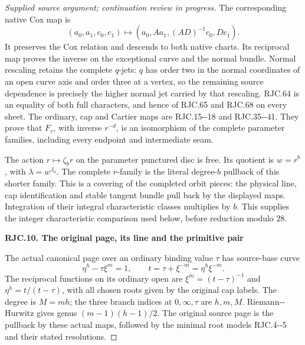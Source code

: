\begin{proof}[Supplied source argument; continuation review in progress]
The corresponding native Cox map is
\[
 (a_0,a_1,c_0,c_1)\longmapsto
 (a_0,Aa_1,(AD)^{-1}c_0,Dc_1).
 \tag{RJC.68}
\]
It preserves the Cox relation and descends to both
native charts. Its reciprocal map proves the
inverse on the exceptional curve and the normal
bundle. Normal rescaling retains the complete
\(q\)-jets: \(q\) has order two in the normal
coordinates of an open curve axis and order three
at a vertex, so the remaining source dependence
is precisely the higher normal jet carried by
that rescaling.
RJC.64 is an equality of both full characters,
and hence of RJC.65 and RJC.68 on every sheet.
The ordinary, cap and Cartier maps are
RJC.15-\/-18 and RJC.35-\/-41.
They prove that \(F_r\), with inverse \(r^{-d}\),
is an isomorphism of the complete parameter
families, including every endpoint and intermediate
seam.

The action \(r\mapsto\zeta_b r\) on the parameter
punctured disc is free. Its quotient is \(w=r^b\),
with \(\lambda=w^{J_0}\).
The complete \(r\)-family is the literal degree-\(b\)
pullback of this shorter family.
This is a covering of the completed orbit pieces:
the physical line, cap identification and stable
tangent bundle pull back by the displayed maps.
Integration of their integral characteristic
classes multiplies by \(b\). This supplies the
integer characteristic comparison used below,
before reduction modulo \(28\).

\par

\medskip\noindent\textbf{RJC.10. The original page, its line and the primitive pair}

\par\nobreak

The actual canonical page over an ordinary binding
value \(\tau\) has source-base curve
\[
 \eta^h-\tau\xi^m=1,\qquad
 t=\tau+\xi^{-m}=\eta^h\xi^{-m}.
 \tag{RJC.69}
\]
The reciprocal functions on its ordinary open are
\(\xi^m=(t-\tau)^{-1}\) and
\(\eta^h=t/(t-\tau)\), with all chosen roots
given by the original cap labels.
The degree is \(M=mh\); the three branch indices
at \(0,\infty,\tau\) are \(h,m,M\).
Riemann-\/-Hurwitz gives genus
\((m-1)(h-1)/2\).
The original source page is the pullback by
these actual maps, followed by the minimal root
models RJC.4-\/-5 and their stated resolutions.


\end{proof}
